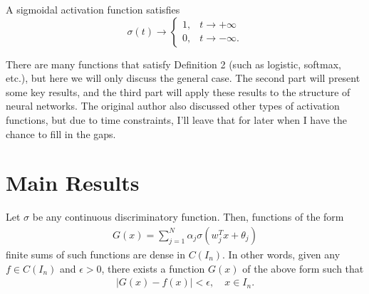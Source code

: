 \documentclass[12pt]{article}
\begin{document}
\begin{mydefinition}
    A sigmoidal activation function satisfies
    $$\sigma(t) \to 
    \begin{cases} 
    1, & t \to +\infty \\
    0, &  t \to -\infty.
    \end{cases}$$
\end{mydefinition}
There are many functions that satisfy Definition 2 (such as logistic, softmax, etc.), but here we will only discuss the general case. The second part will present some key results, and the third part will apply these results to the structure of neural networks. The original author also discussed other types of activation functions, but due to time constraints, I’ll leave that for later when I have the chance to fill in the gaps.

\section{Main Results}

\begin{mytheorem}
    Let $\sigma$ be any continuous discriminatory function. Then, functions of the form
    \begin{align}
        G(x)=\sum_{j=1}^N \alpha_j \sigma (w_j^T x +\theta_j)
    \end{align}
    finite sums of such functions are dense in $C(I_n)$. In other words, given any $f \in C(I_n)$ and $\epsilon > 0$, there exists a function $G(x)$ of the above form such that\begin{align*}
        |G(x)-f(x)|<\epsilon, \quad x\in I_n.    \end{align*}
\end{mytheorem}
\end{document}
